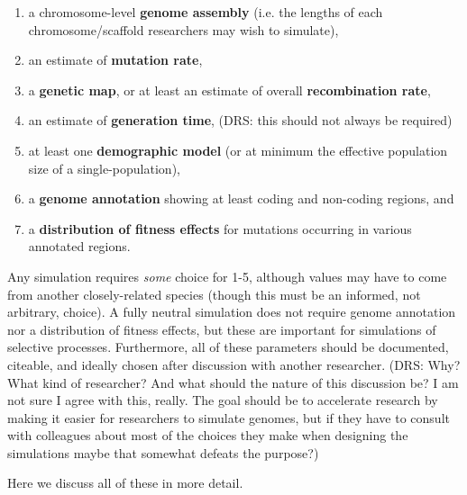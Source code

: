 \documentclass[hidelinks]{article}
\providecommand{\tightlist}{%
\setlength{\itemsep}{0pt}\setlength{\parskip}{0pt}}
\begin{document}
\begin{enumerate}
\def\labelenumi{\arabic{enumi}.}
\tightlist
\item
  a chromosome-level \textbf{genome assembly} (i.e. the lengths of each
  chromosome/scaffold researchers may wish to simulate),
\item
  an estimate of \textbf{mutation rate},
\item
  a \textbf{genetic map}, or at least an estimate of overall \textbf{recombination rate},
\item
  an estimate of \textbf{generation time}, (DRS: this should not always be required)
\item
  at least one \textbf{demographic model} (or at minimum the effective
  population size of a single-population),
\item
  a \textbf{genome annotation} showing at least coding and non-coding
  regions, and
\item
  a \textbf{distribution of fitness effects} for mutations occurring in
  various annotated regions.
\end{enumerate}

Any simulation requires \emph{some} choice for 1-5, although values may
have to come from another closely-related species (though this must be
an informed, not arbitrary, choice). A fully neutral simulation does not
require genome annotation nor a distribution of fitness effects, but
these are important for simulations of selective processes. Furthermore,
all of these parameters should be documented, citeable, and
ideally chosen after discussion with another researcher. (DRS: Why? 
What kind of researcher? And what should the nature of this discussion be? 
I am not sure I agree with this, really. The goal should be to accelerate
research by making it easier for researchers to simulate genomes, but if
they have to consult with colleagues about most of the choices they make
when designing the simulations maybe that somewhat defeats the purpose?)

Here we discuss all of these in more detail.
\end{document}
